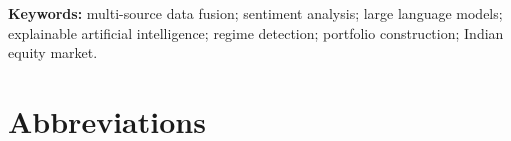 \vspace{0.3em}
\noindent\textbf{Keywords:} multi-source data fusion; sentiment analysis; large language
models; explainable artificial intelligence; regime detection; portfolio construction; Indian
equity market.

\clearpage
\renewcommand{\contentsname}{Table of Contents}
{\tableofcontents}

\clearpage
\renewcommand{\listfigurename}{List of Figures}
{\listoffigures}
\vspace{1.2em}
\renewcommand{\listtablename}{List of Tables}
{\listoftables}

\clearpage
\chapter*{Abbreviations}

